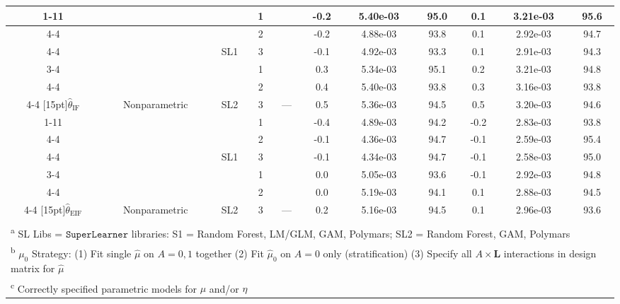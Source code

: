 \begin{table}
\begin{tabular}[t]{ccccccccccc}
\cmidrule{1-11}
 &  &  &  1 &  & -0.2 & 5.40e-03 & 95.0 & 0.1 & 3.21e-03 & 95.6\\
\cmidrule{4-4}
\cmidrule{6-11}
 &  &  &  2 &  & -0.2 & 4.88e-03 & 93.8 & 0.1 & 2.92e-03 & 94.7\\
\cmidrule{4-4}
\cmidrule{6-11}
 &  & \multirow{-3}{*}[5pt]{\centering\arraybackslash SL1} &  3 &  & -0.1 & 4.92e-03 & 93.3 & 0.1 & 2.91e-03 & 94.3\\
\cmidrule{3-4}
\cmidrule{6-11}
 &  &  &  1 &  & 0.3 & 5.34e-03 & 95.1 & 0.2 & 3.21e-03 & 94.8\\
\cmidrule{4-4}
\cmidrule{6-11}
 &  &  &  2 &  & 0.4 & 5.40e-03 & 93.8 & 0.3 & 3.16e-03 & 93.8\\
\cmidrule{4-4}
\cmidrule{6-11}
\multirow{-6}{*}[15pt]{\centering\arraybackslash $\widehat\theta_\text{IF}$} & \multirow{-6}{*}[15pt]{\centering\arraybackslash  Nonparametric} & \multirow{-3}{*}[5pt]{\centering\arraybackslash SL2} &  3 & \multirow{-6}{*}[15pt]{\centering\arraybackslash  ---} & 0.5 & 5.36e-03 & 94.5 & 0.5 & 3.20e-03 & 94.6\\
\cmidrule{1-11}
 &  &  &  1 &  & -0.4 & 4.89e-03 & 94.2 & -0.2 & 2.83e-03 & 93.8\\
\cmidrule{4-4}
\cmidrule{6-11}
 &  &  &  2 &  & -0.1 & 4.36e-03 & 94.7 & -0.1 & 2.59e-03 & 95.4\\
\cmidrule{4-4}
\cmidrule{6-11}
 &  & \multirow{-3}{*}[5pt]{\centering\arraybackslash SL1} &  3 &  & -0.1 & 4.34e-03 & 94.7 & -0.1 & 2.58e-03 & 95.0\\
\cmidrule{3-4}
\cmidrule{6-11}
 &  &  &  1 &  & 0.0 & 5.05e-03 & 93.6 & -0.1 & 2.92e-03 & 94.8\\
\cmidrule{4-4}
\cmidrule{6-11}
 &  &  &  2 &  & 0.0 & 5.19e-03 & 94.1 & 0.1 & 2.88e-03 & 94.5\\
\cmidrule{4-4}
\cmidrule{6-11}
\multirow{-6}{*}[15pt]{\centering\arraybackslash $\widehat\theta_\text{EIF}$} & \multirow{-6}{*}[15pt]{\centering\arraybackslash  Nonparametric} & \multirow{-3}{*}[5pt]{\centering\arraybackslash SL2} &  3 & \multirow{-6}{*}[15pt]{\centering\arraybackslash  ---} & 0.2 & 5.16e-03 & 94.5 & 0.1 & 2.96e-03 & 93.6\\
\bottomrule\\
\multicolumn{11}{l}{\textsuperscript{a} SL Libs = $\texttt{SuperLearner}$ libraries: S1 = {Random Forest, LM/GLM, GAM, Polymars}; SL2 = {Random Forest, GAM, Polymars}}\\
\multicolumn{11}{l}{\textsuperscript{b} $\mu_0$ Strategy: (1) Fit single $\widehat\mu$ on $A = 0,1$ together (2) Fit $\widehat\mu_0$ on $A = 0$ only (stratification) (3) Specify all $A\times\bm L$ interactions in design matrix for $\widehat\mu$}\\
\multicolumn{11}{l}{\textsuperscript{c} Correctly specified parametric models for $\mu$ and/or $\eta$}\\
\end{tabular}
\end{table}
